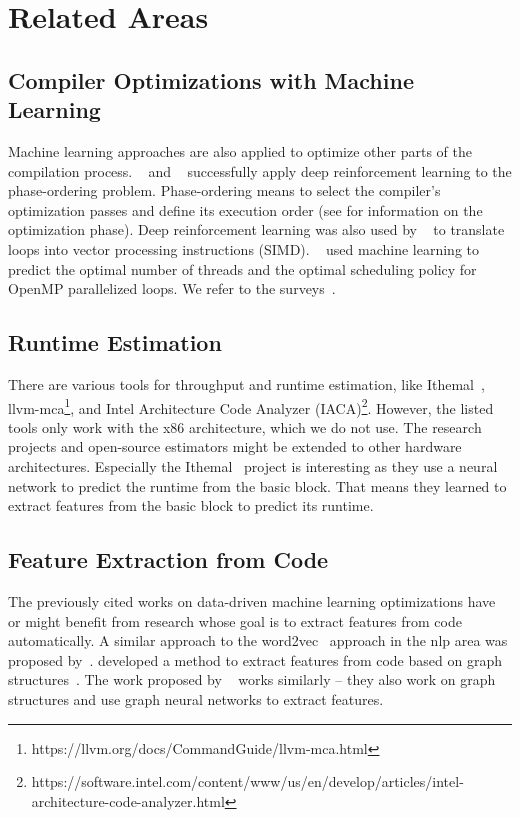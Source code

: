 \section{Related Areas}
\label{sec:rw:other}
\subsection{Compiler Optimizations with Machine Learning}
Machine learning approaches are also applied to optimize other parts of the compilation process.
\citeauthor{mammadli2020static}~\cite{mammadli2020static} and \citeauthor{huang2019autophase}~\cite{huang2019autophase} successfully apply deep reinforcement learning to the phase-ordering problem.
Phase-ordering means to select the compiler's optimization passes and define its execution order (see  for information on the optimization phase).
Deep reinforcement learning was also used by \citeauthor{haj2020neurovectorizer}~\cite{haj2020neurovectorizer} to translate loops into vector processing instructions (SIMD).
\citeauthor{wang2009mapping}~\cite{wang2009mapping} used machine learning to predict the optimal number of threads and the optimal scheduling policy for OpenMP parallelized loops.
We refer to the surveys~\cite{wang2018machine,ashouri2018survey}.

\subsection{Runtime Estimation}
\label{sec:rw:other:runtime}
There are various tools for throughput and runtime estimation, like Ithemal~\cite{mendis2019ithemal}, llvm-mca\footnote{https://llvm.org/docs/CommandGuide/llvm-mca.html}, and Intel Architecture Code Analyzer (IACA)\footnote{https://software.intel.com/content/www/us/en/develop/articles/intel-architecture-code-analyzer.html}.
However, the listed tools only work with the x86 architecture, which we do not use.
The research projects and open-source estimators might be extended to other hardware architectures.
Especially the Ithemal~\cite{mendis2019ithemal} project is interesting as they use a neural network to predict the runtime from the basic block.
That means they learned to extract features from the basic block to predict its runtime.

\subsection{Feature Extraction from Code}
The previously cited works on data-driven machine learning optimizations have or might benefit from research whose goal is to extract features from code automatically.
A similar approach to the word2vec~\cite{mikolov2013efficient} approach in the \ac{nlp} area was proposed by~\cite{ben2018neural,alon2019code2vec}.
\citeauthor{cummins2021programl} developed a method to extract features from code based on graph structures~\cite{cummins2021programl}.
The work proposed by \citeauthor{brauckmann2020compiler}~\cite{brauckmann2020compiler} works similarly -- they also work on graph structures and use graph neural networks to extract features.


